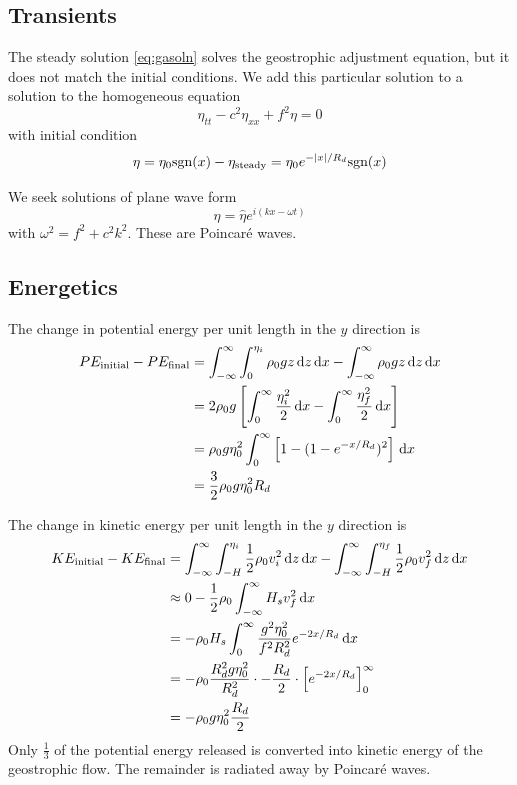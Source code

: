 \documentclass{jknotes}
\begin{document}
\subsection{Transients}

The steady solution \eqref{eq:gasoln} solves the geostrophic adjustment
equation, but it does not match the initial conditions. We add this particular
solution to a solution to the homogeneous equation
\begin{equation}
	\eta_{tt} - c^2 \eta_{xx} + f^2 \eta = 0
\end{equation}
with initial condition
\begin{equation}
	\eta = \eta_0 \text{sgn}(x) - \eta_{\text{steady}} = \eta_0
	e^{-\abs{x}/R_d}\text{sgn}(x)
\end{equation}

We seek solutions of plane wave form
\begin{equation}
	\eta = \hat{\eta} e^{i(kx-\omega t)}
\end{equation}
with $\omega^2 = f^2 + c^2 k^2$. These are Poincar\'{e} waves.

\subsection{Energetics}
The change in potential energy per unit length in the $y$ direction is
\begin{align}
	PE_{\text{initial}} - PE_{\text{final}} &= \int_{-\infty}^\infty
	\int_0^{\eta_i} \rho_0 g z \, \diffd z \, \diffd x - \int_{-\infty}^\infty
	\rho_0 g z \, \diffd z\,\diffd x \\
	&= 2\rho_0 g \left[ \int_0^\infty \frac{\eta_i^2}{2}\,\diffd x -
\int_0^\infty \frac{\eta_f^2}{2}\,\diffd x \right] \\
&= \rho_0 g \eta_0^2 \int_0^\infty \left[ 1- (1-e^{-x/R_d})^2\right] \, \diffd
x\\
&= \frac{3}{2}\rho_0 g \eta_0^2 R_d
\end{align}

The change in kinetic energy per unit length in the $y$ direction is
\begin{align}
	KE_{\text{initial}} - KE_{\text{final}} &= \int_{-\infty}^\infty
	\int_{-H}^{\eta_i} \frac{1}{2} \rho_0 v_i^2 \,\diffd z\, \diffd x -
	\int_{-\infty}^\infty \int_{-H}^{\eta_f} \frac{1}{2} \rho_0 v_f^2 \,\diffd
	z\, \diffd x \\
	&\approx 0 - \frac{1}{2}\rho_0 \int_{-\infty}^\infty H_s v^2_f \, \diffd x
	\\
	&= -\rho_0 H_s \int_0^\infty \frac{g^2 \eta_0^2}{f^2 R_d^2} e^{-2x/R_d} \,
	\diffd x \\
	&= -\rho_0 \frac{R_d^2 g \eta_0^2}{R_d^2}\cdot -\frac{R_d}{2} \cdot \left[
e^{-2x/R_d} \right]_0^\infty \\
&= -\rho_0 g \eta_0^2 \frac{R_d}{2}
\end{align}
Only $\frac{1}{3}$ of the potential energy released is converted into kinetic
energy of the geostrophic flow. The remainder is radiated away by Poincar\'{e}
waves.
\end{document}
